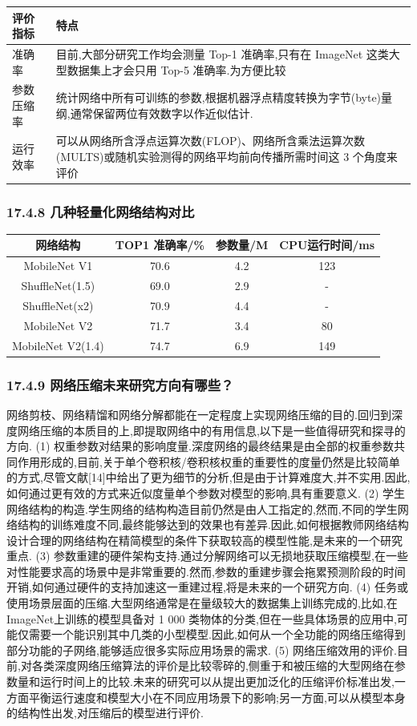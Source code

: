 \begin{longtable}[]{ ll }
\toprule
评价指标 & 特点\tabularnewline
\midrule
\endhead
准确率 & 目前,大部分研究工作均会测量 Top-1 准确率,只有在 ImageNet
这类大型数据集上才会只用 Top-5 准确率.为方便比较\tabularnewline
参数压缩率 &
统计网络中所有可训练的参数,根据机器浮点精度转换为字节(byte)量纲,通常保留两位有效数字以作近似估计.\tabularnewline
运行效率 &
可以从网络所含浮点运算次数(FLOP)、网络所含乘法运算次数(MULTS)或随机实验测得的网络平均前向传播所需时间这
3 个角度来评价\tabularnewline
\bottomrule
\end{longtable}

\subsubsection{17.4.8
几种轻量化网络结构对比}\label{ux51e0ux79cdux8f7bux91cfux5316ux7f51ux7edcux7ed3ux6784ux5bf9ux6bd4}

\begin{longtable}[]{ cccc }
\toprule
网络结构 & TOP1 准确率/\% & 参数量/M & CPU运行时间/ms\tabularnewline
\midrule
\endhead
MobileNet V1 & 70.6 & 4.2 & 123\tabularnewline
ShuffleNet(1.5) & 69.0 & 2.9 & -\tabularnewline
ShuffleNet(x2) & 70.9 & 4.4 & -\tabularnewline
MobileNet V2 & 71.7 & 3.4 & 80\tabularnewline
MobileNet V2(1.4) & 74.7 & 6.9 & 149\tabularnewline
\bottomrule
\end{longtable}

\subsubsection{17.4.9
网络压缩未来研究方向有哪些？}\label{ux7f51ux7edcux538bux7f29ux672aux6765ux7814ux7a76ux65b9ux5411ux6709ux54eaux4e9b}

网络剪枝、网络精馏和网络分解都能在一定程度上实现网络压缩的目的.回归到深度网络压缩的本质目的上,即提取网络中的有用信息,以下是一些值得研究和探寻的方向.
(1)
权重参数对结果的影响度量.深度网络的最终结果是由全部的权重参数共同作用形成的,目前,关于单个卷积核/卷积核权重的重要性的度量仍然是比较简单的方式,尽管文献{[}14{]}中给出了更为细节的分析,但是由于计算难度大,并不实用.因此,如何通过更有效的方式来近似度量单个参数对模型的影响,具有重要意义.
(2)
学生网络结构的构造.学生网络的结构构造目前仍然是由人工指定的,然而,不同的学生网络结构的训练难度不同,最终能够达到的效果也有差异.因此,如何根据教师网络结构设计合理的网络结构在精简模型的条件下获取较高的模型性能,是未来的一个研究重点.
(3)
参数重建的硬件架构支持.通过分解网络可以无损地获取压缩模型,在一些对性能要求高的场景中是非常重要的.然而,参数的重建步骤会拖累预测阶段的时间开销,如何通过硬件的支持加速这一重建过程,将是未来的一个研究方向.
(4)
任务或使用场景层面的压缩.大型网络通常是在量级较大的数据集上训练完成的,比如,在
ImageNet上训练的模型具备对 1 000
类物体的分类,但在一些具体场景的应用中,可能仅需要一个能识别其中几类的小型模型.因此,如何从一个全功能的网络压缩得到部分功能的子网络,能够适应很多实际应用场景的需求.
(5)
网络压缩效用的评价.目前,对各类深度网络压缩算法的评价是比较零碎的,侧重于和被压缩的大型网络在参数量和运行时间上的比较.未来的研究可以从提出更加泛化的压缩评价标准出发,一方面平衡运行速度和模型大小在不同应用场景下的影响;另一方面,可以从模型本身的结构性出发,对压缩后的模型进行评价.

